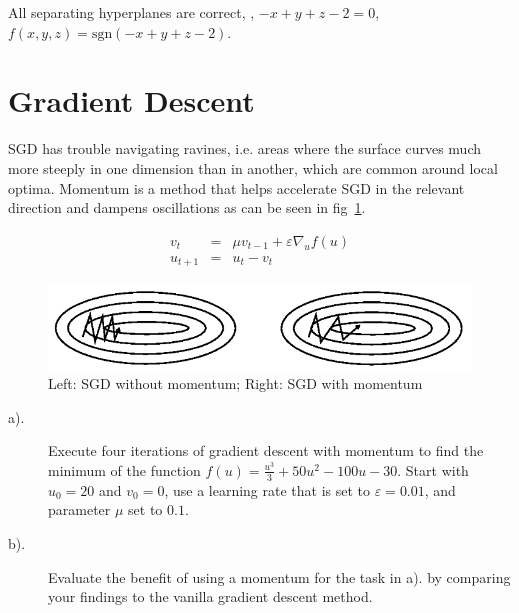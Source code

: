 \documentclass[12pt]{article}
\begin{document}
All separating hyperplanes are correct, \eg, $-x+y+z-2=0$, $f(x,y,z)=\mathrm{sgn}(-x+y+z-2)$.



\section{Gradient Descent}
SGD has trouble navigating ravines, i.e. areas where the surface curves much more steeply in one dimension than in another, which are common around local optima. Momentum is a method that helps accelerate SGD in the relevant direction and dampens oscillations as can be seen in fig~\ref{fig:momentum}.

\begin{eqnarray}
	v_t & = & \mu v_{t-1} + \varepsilon \nabla_u f(u) \label{eq:1} \\
	u_{t+1} & =& u_{t} - v_t \label{eq:2}
\end{eqnarray}

\begin{figure}[!htbp]
	\centering
	\includegraphics[width=.7\textwidth]{fig/2018-03-19-13-38-08.png}
	\caption{Left: SGD without momentum; Right: SGD with momentum} \label{fig:momentum}
\end{figure}

\begin{description}
	\item[a).] Execute four iterations of gradient descent with momentum to find the minimum of
	      the function $f(u) = \frac{u^3}{3} + 50 u^2-100u-30$. Start with $u_0 = 20$ and $v_0=0$, use a learning rate
	      that is set to $\varepsilon = 0.01$, and parameter $\mu$ set to $0.1$.
	\item[b).] Evaluate the benefit of using a momentum for the task in a). by comparing your
	      findings to the vanilla gradient descent method.
\end{description}
\end{document}
